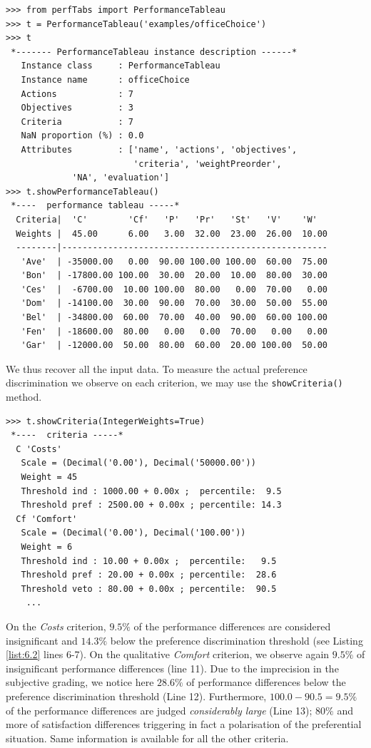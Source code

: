 \begin{lstlisting}[caption={Inspecting the \texttt{officeChoice} performance tableau},label=list:6.1]
>>> from perfTabs import PerformanceTableau
>>> t = PerformanceTableau('examples/officeChoice')
>>> t
 *------- PerformanceTableau instance description ------*
   Instance class     : PerformanceTableau
   Instance name      : officeChoice
   Actions            : 7
   Objectives         : 3
   Criteria           : 7
   NaN proportion (%) : 0.0
   Attributes         : ['name', 'actions', 'objectives',
                         'criteria', 'weightPreorder',
			 'NA', 'evaluation']
>>> t.showPerformanceTableau()
 *----  performance tableau -----*
  Criteria|  'C'        'Cf'   'P'   'Pr'   'St'   'V'    'W'   
  Weights |  45.00      6.00   3.00  32.00  23.00  26.00  10.00    
  --------|----------------------------------------------------
   'Ave'  | -35000.00   0.00  90.00 100.00 100.00  60.00  75.00  
   'Bon'  | -17800.00 100.00  30.00  20.00  10.00  80.00  30.00  
   'Ces'  |  -6700.00  10.00 100.00  80.00   0.00  70.00   0.00  
   'Dom'  | -14100.00  30.00  90.00  70.00  30.00  50.00  55.00  
   'Bel'  | -34800.00  60.00  70.00  40.00  90.00  60.00 100.00  
   'Fen'  | -18600.00  80.00   0.00   0.00  70.00   0.00   0.00  
   'Gar'  | -12000.00  50.00  80.00  60.00  20.00 100.00  50.00  
\end{lstlisting}

We thus recover all the input data. To measure the actual preference discrimination we observe on each criterion, we may use the \texttt{showCriteria()} method.

\begin{lstlisting}[caption={Inspecting the performance criteria},label=list:6.2]
>>> t.showCriteria(IntegerWeights=True)
 *----  criteria -----*
  C 'Costs'
   Scale = (Decimal('0.00'), Decimal('50000.00'))
   Weight = 45
   Threshold ind : 1000.00 + 0.00x ;  percentile:  9.5
   Threshold pref : 2500.00 + 0.00x ; percentile: 14.3
  Cf 'Comfort'
   Scale = (Decimal('0.00'), Decimal('100.00'))
   Weight = 6
   Threshold ind : 10.00 + 0.00x ;  percentile:   9.5
   Threshold pref : 20.00 + 0.00x ; percentile:  28.6
   Threshold veto : 80.00 + 0.00x ; percentile:  90.5
    ...
\end{lstlisting}

On the \emph{Costs} criterion, $9.5\%$ of the performance differences are considered insignificant and $14.3\%$ below the preference discrimination threshold (see Listing \ref{list:6.2} lines 6-7). On the qualitative \emph{Comfort} criterion, we observe again $9.5\%$ of insignificant performance differences (line 11). Due to the imprecision in the subjective grading, we notice here $28.6\%$ of performance differences below the preference discrimination threshold (Line 12). Furthermore, $100.0 - 90.5 = 9.5\%$ of the performance differences are judged \emph{considerably large} (Line 13); $80\%$ and more of satisfaction differences triggering in fact a polarisation of the preferential situation. Same information is available for all the other criteria. 
 
